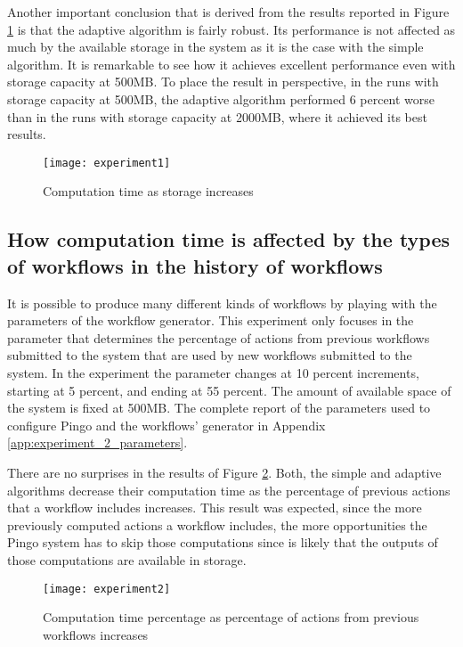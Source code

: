 Another important conclusion that is derived from the results reported in Figure \ref{fig:experiment1} is that the adaptive algorithm is fairly robust. Its performance is not affected as much by the available storage in the system as it is the case with the simple algorithm. It is remarkable to see how it achieves excellent performance even with storage capacity at 500MB.  To place the result in perspective, in the runs with storage capacity at 500MB, the adaptive algorithm performed 6 percent worse than in the runs with storage capacity at 2000MB, where it achieved its best results.


\begin{figure}
\centering
\texttt{[image: experiment1]}
\caption{Computation time as storage increases}
\label{fig:experiment1}
\end{figure}

\subsection{How computation time is affected by the types of workflows in the history of workflows}
It is possible to produce many different kinds of workflows by playing with the parameters of the workflow generator.  This experiment only focuses in the parameter that determines the percentage of actions from previous workflows submitted to the system that are used by new workflows submitted to the system.  In the experiment the parameter changes at 10 percent increments, starting at 5 percent, and ending at 55 percent.  The amount of available space of the system is fixed at 500MB.   The complete report of the parameters used to configure Pingo and the workflows' generator in Appendix \ref{app:experiment_2_parameters}.

There are no surprises in the results of Figure \ref{fig:experiment2}.  Both, the simple and adaptive algorithms decrease their computation time as the percentage of previous actions that a workflow includes increases.  This result was expected, since the more previously computed actions a workflow includes, the more opportunities the Pingo system has to skip those computations since is likely that the outputs of those computations are available in storage.

\begin{figure}
\centering
\texttt{[image: experiment2]}
\caption{Computation time percentage as percentage of actions from previous workflows increases}
\label{fig:experiment2}
\end{figure}

